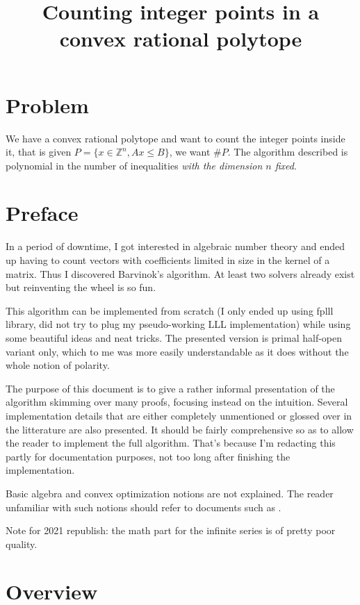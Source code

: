 \documentclass[14pt]{article}
\title{Counting integer points in a convex rational polytope}
\newcommand{\Z}{\mathbb{Z}}
\begin{document}
\date{}
\maketitle

\section*{Problem}

We have a convex rational polytope and want to count the integer points inside it, that is given $P = \{x \in \Z^n, Ax \le B\}$, we want $\#P$.
The algorithm described is polynomial in the number of inequalities \emph{with the dimension $n$ fixed}.

\section*{Preface}

In a period of downtime, I got interested in algebraic number theory and ended up having to count vectors with coefficients limited in size in the kernel of a matrix. Thus I discovered Barvinok's algorithm. At least two solvers already exist but reinventing the wheel is so fun.

This algorithm can be implemented from scratch (I only ended up using fplll library, did not try to plug my pseudo-working LLL implementation) while using some beautiful ideas and neat tricks. The presented version is primal half-open variant only, which to me was more easily understandable as it does without the whole notion of polarity.

The purpose of this document is to give a rather informal presentation of the algorithm skimming over many proofs, focusing instead on the intuition. Several implementation details that are either completely unmentioned or glossed over in the litterature are also presented. It should be fairly comprehensive so as to allow the reader to implement the full algorithm. That's because I'm redacting this partly for documentation purposes, not too long after finishing the implementation.


Basic algebra and convex optimization notions are not explained. The reader unfamiliar with such notions should refer to documents such as \cite{DeLoera2012}.


Note for 2021 republish: the math part for the infinite series is of pretty poor quality.

\section*{Overview}
\end{document}
